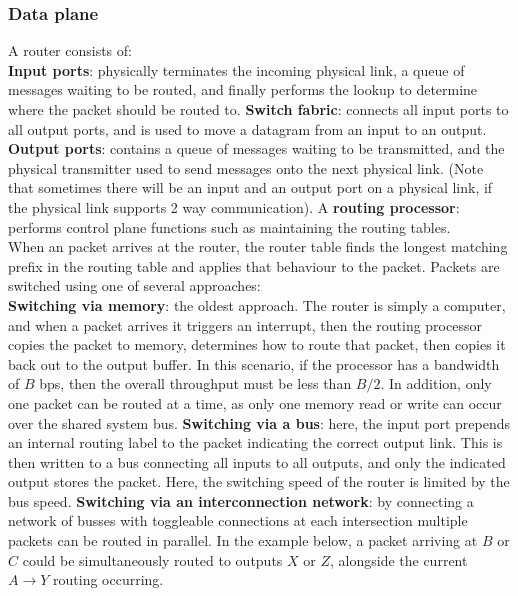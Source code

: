 \subsubsection{Data plane}
A router consists of:\\
\textbf{Input ports}: physically terminates the incoming physical link, a queue of messages waiting to be routed, and finally performs the lookup to determine where the packet should be routed to.
\textbf{Switch fabric}: connects all input ports to all output ports, and is used to move a datagram from an input to an output.
\textbf{Output ports}: contains a queue of messages waiting to be transmitted, and the physical transmitter used to send messages onto the next physical link. (Note that sometimes there will be an input and an output port on a physical link, if the physical link supports 2 way communication).
A \textbf{routing processor}: performs control plane functions such as maintaining the routing tables.\\
When an packet arrives at the router, the router table finds the longest matching prefix in the routing table and applies that behaviour to the packet. Packets are switched using one of several approaches:\\
\textbf{Switching via memory}: the oldest approach. The router is simply a computer, and when a packet arrives it triggers an interrupt, then the routing processor copies the packet to memory, determines how to route that packet, then copies it back out to the output buffer. In this scenario, if the processor has a bandwidth of $B$ bps, then the overall throughput must be less than $B/2$. In addition, only one packet can be routed at a time, as only one memory read or write can occur over the shared system bus. \textbf{Switching via a bus}: here, the input port prepends an internal routing label to the packet indicating the correct output link. This is then written to a bus connecting all inputs to all outputs, and only the indicated output stores the packet. Here, the switching speed of the router is limited by the bus speed. \textbf{Switching via an interconnection network}: by connecting a network of busses with toggleable connections at each intersection multiple packets can be routed in parallel. In the example below, a packet arriving at $B$ or $C$ could be simultaneously routed to outputs $X$ or $Z$, alongside the current $A\rightarrow Y$ routing occurring.\\

